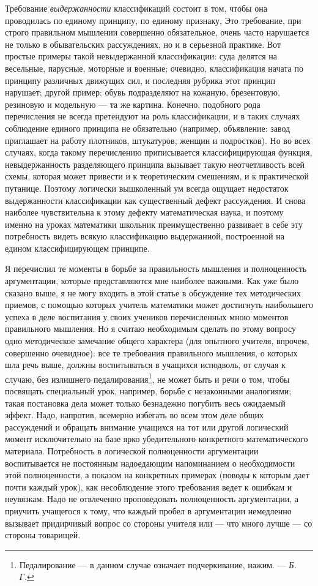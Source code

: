\documentclass[12pt, a4paper, openany]{book}
\begin{document}
Требование \textit{выдержанности} классификаций состоит в том, чтобы она проводилась по единому принципу, по  единому признаку, Это требование, при строго правильном мышлении совершенно обязательное, очень часто  нарушается не только в обывательских рассуждениях, но и в серьезной практике. Вот простые примеры такой  невыдержанной классификации: суда делятся на весельные,  парусные, моторные и военные; очевидно, классификация  начата по принципу различных движущих сил, и последняя рубрика этот принцип нарушает; другой пример: обувь подразделяют на кожаную, брезентовую, резиновую и  модельную — та же картина. Конечно, подобного рода  перечисления не всегда претендуют на роль классификации, и в таких случаях соблюдение единого принципа не  обязательно (например, объявление: завод приглашает на  работу плотников, штукатуров, женщин и подростков). Но во всех случаях, когда такому перечислению приписывается классифицирующая функция, невыдержанность  разделяющего принципа вызывает такую неотчетливость всей схемы, которая может привести и к теоретическим смешениям, и к практической путанице. Поэтому логически вышколенный ум всегда ощущает недостаток выдержанности  классификации как существенный дефект рассуждения. И снова наиболее чувствительна к этому дефекту математическая наука, и поэтому именно на уроках математики школьник преимущественно развивает в себе эту потребность видеть всякую классификацию выдержанной, построенной на едином классифицирующем принципе. 

Я перечислил те моменты в борьбе за правильность мышления и полноценность аргументации, которые  представляются мне наиболее важными. Как уже было сказано выше, я не могу входить в этой статье в обсуждение тех методических приемов, с помощью которых учитель  математики может достигнуть наибольшего успеха в деле воспитания у своих учеников перечисленных мною  моментов правильного мышления. Но я считаю необходимым сделать по этому вопросу одно методическое замечание общего характера (для опытного учителя, впрочем,  совершенно очевидное): все те требования правильного  мышления, о которых шла речь выше, должны воспитываться в учащихся исподволь, от случая к случаю, без излишнего педалирования{\footnote{Педалирование — в данном случае означает подчеркивание, нажим. — \textit{Б. Г.}}}, не может быть и речи о том, чтобы посвящать специальный урок, например, борьбе с  незаконными аналогиями; такая постановка дела может только безнадежно погубить весь ожидаемый эффект. Надо,  напротив, всемерно избегать во всем этом деле общих  рассуждений и обращать внимание учащихся на тот или другой логический момент исключительно на базе ярко  убедительного конкретного математического материала. Потребность в логической полноценности аргументации воспитывается не постоянным надоедающим напоминанием о  необходимости этой полноценности, а показом на конкретных  примерах (поводы к которым дает почти каждый урок), как несоблюдение этого требования ведет к ошибкам и  неувязкам. Надо не отвлеченно проповедовать полноценность аргументации, а приучить учащегося к тому, что каждый пробел в аргументации немедленно вызывает придирчивый вопрос со стороны учителя или — что много лучше — со стороны товарищей. 
\end{document}
